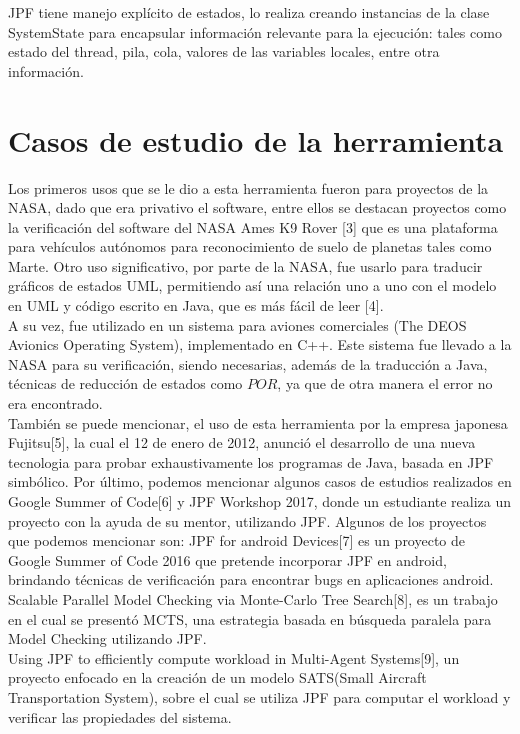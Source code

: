 \documentclass[runningheads]{llncs}
\begin{document}
JPF tiene manejo expl\'icito de estados, lo realiza creando instancias de la clase SystemState para encapsular informaci\'on relevante para la ejecuci\'on: tales como estado del thread, pila, cola, valores de las variables locales, entre otra informaci\'on.


\section{Casos de estudio de la herramienta}

Los primeros usos que se le dio a esta herramienta fueron para proyectos de la NASA, dado que era privativo el software, entre ellos se destacan proyectos como la verificaci\'on del software del NASA Ames K9 Rover [3] que es una plataforma para veh\'iculos aut\'onomos para reconocimiento de suelo de planetas tales como Marte.
Otro uso significativo, por parte de la NASA, fue usarlo para traducir gr\'aficos de estados UML, permitiendo as\'i una relaci\'on uno a uno con el modelo en UML y c\'odigo escrito en Java, que es m\'as f\'acil de leer [4].\\
A su vez, fue utilizado en un sistema para aviones comerciales (The DEOS Avionics Operating System), implementado en C++. Este sistema fue llevado a la NASA para su verificaci\'on, siendo necesarias, adem\'as de la traducci\'on a Java, t\'ecnicas de reducci\'on de estados como $POR$, ya que de otra manera el error no era encontrado.\\
Tambi\'en se puede mencionar, el uso de esta herramienta por la empresa japonesa Fujitsu[5], la cual el 12 de enero de 2012, anunci\'o el desarrollo de una nueva tecnologia para probar exhaustivamente los programas de Java, basada en JPF simb\'olico.
Por \'ultimo, podemos mencionar algunos casos de estudios realizados en Google Summer of Code[6] y JPF Workshop 2017, donde un estudiante realiza un proyecto con la ayuda de su mentor, utilizando JPF. Algunos de los proyectos que podemos mencionar son: 
JPF for android Devices[7] es un proyecto de Google Summer of Code 2016 que pretende incorporar JPF en android, brindando t\'ecnicas de verificaci\'on para encontrar bugs en aplicaciones android.\\
Scalable Parallel Model Checking via Monte-Carlo Tree Search[8], es un trabajo en el cual se present\'o MCTS, una estrategia basada en b\'usqueda paralela para Model Checking utilizando JPF.\\
Using JPF to efficiently compute workload in Multi-Agent Systems[9], un proyecto enfocado en la creaci\'on de un modelo SATS(Small Aircraft Transportation System), sobre el cual se utiliza JPF para computar el workload y verificar las propiedades del sistema.\\
\end{document}
